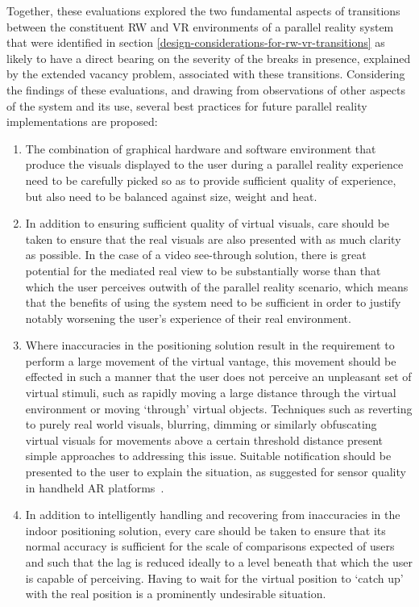 Together, these evaluations explored the two fundamental aspects of transitions between the constituent RW and VR environments of a parallel reality system that were identified in section \ref{design-considerations-for-rw-vr-transitions} as likely to have a direct bearing on the severity of the breaks in presence, explained by the extended vacancy problem, associated with these transitions. Considering the findings of these evaluations, and drawing from observations of other aspects of the system and its use, several best practices for future parallel reality implementations are proposed:

\begin{enumerate}
	\item The combination of graphical hardware and software environment that produce the visuals displayed to the user during a parallel reality experience need to be carefully picked so as to provide sufficient quality of experience, but also need to be balanced against size, weight and heat.
	

	\item In addition to ensuring sufficient quality of virtual visuals, care should be taken to ensure that the real visuals are also presented with as much clarity as possible. In the case of a video see-through solution, there is great potential for the mediated real view to be substantially worse than that which the user perceives outwith of the parallel reality scenario, which means that the benefits of using the system need to be sufficient in order to justify notably worsening the user's experience of their real environment.
	
	\item Where inaccuracies in the positioning solution result in the requirement to perform a large movement of the virtual vantage, this movement should be effected in such a manner that the user does not perceive an unpleasant set of virtual stimuli, such as rapidly moving a large distance through the virtual environment or moving `through' virtual objects. Techniques such as reverting to purely real world visuals, blurring, dimming or similarly obfuscating virtual visuals for movements above a certain threshold distance present simple approaches to addressing this issue. Suitable notification should be presented to the user to explain the situation, as suggested for sensor quality in handheld AR platforms~\cite{Billinghurst2014}.
	
	\item In addition to intelligently handling and recovering from inaccuracies in the indoor positioning solution, every care should be taken to ensure that its normal accuracy is sufficient for the scale of comparisons expected of users and such that the lag is reduced ideally to a level beneath that which the user is capable of perceiving. Having to wait for the virtual position to `catch up' with the real position is a prominently undesirable situation.
	


\end{enumerate}
